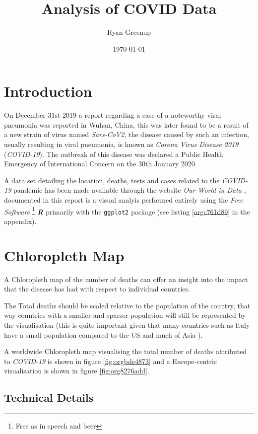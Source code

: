 \documentclass[11pt]{article}
\author{Ryan Greenup}
\date{\today}
\title{Analysis of COVID Data}
\begin{document}
\maketitle
\tableofcontents


\section{Introduction}
\label{sec:org956f2bb}
On December 31st 2019 a report regarding a case of a noteworthy viral pneumonia
was reported in Wuhan, China, this was later found to be a result of a new
strain of virus named \emph{Sars-CoV2}, the disease caused by such an infection,
usually resulting in viral pneumonia, is known as \emph{Corona Virus Disease 2019}
(\emph{COVID-19}). The outbreak of this disease was declared a Public Health
Emergency of International Concern on the 30th January 2020.
\cite{worldhealthorganization2020}

A data set detailing the location, deaths, tests and cases related to the
\emph{COVID-19} pandemic has been made available through the website \emph{Our World in
Data} \cite{ritchie2020}, documented in this report is a visual analyis
performed entirely using the \emph{Free Software} \footnote{Free as in speech and beer} \textbf{\emph{R}} \cite{rcoreteam2020}
primarily with the \texttt{ggplot2} package \cite{wickham2016} (see listing \ref{orgc761d89} in the
appendix).

\section{Chloropleth Map}
\label{sec:org335e89d}
A Chloropleth map of the number of deaths can offer an insight into the impact
that the disease has had with respect to individual countries.

The Total deaths should be scaled relative to the population of the country,
that way countries with a smaller and sparser population will still be
represented by the visualisation (this is quite important given that many
countries such as Italy have a small population compared to the US and much of
Asia \cite{2020n}).

A worldwide Chloropleth map visualising the total number of deaths attributed to
\emph{COVID-19} is shown in figure \ref{fig:orgbde4873} and a Europe-centric visualisation is shown
in figure \ref{fig:org8276add}.

\subsection{Technical Details}
\label{sec:orgb8553bf}
\end{document}
